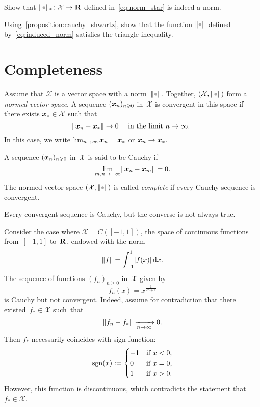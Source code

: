 \begin{exercise}
    Show that $\norm{\placeholder}_*\colon \mathcal X \to \real$ defined in~\eqref{eq:norm_star} is indeed a norm.
\end{exercise}

\begin{exercise}
    \label{exercise:triangle_inequality}
    Using~\cref{proposition:cauchy_shwartz},
    show that the function $\norm{\placeholder}$ defined by~\eqref{eq:induced_norm} satisfies the triangle inequality.
\end{exercise}

\section{Completeness}
Assume that $\mathcal X$ is a vector space with a norm~$\norm{\placeholder}$.
Together, $(\mathcal X,\norm{\placeholder})$ form a \emph{normed vector space}.
A sequence $(\mathbf{\boldsymbol{x}}_n)_{n \geqslant 0}$ in~$\mathcal X$ is convergent in this space
if there exists $\mathbf{\boldsymbol{x}}_* \in \mathcal X$ such that
\[
    \lVert\mathbf{\boldsymbol{x}}_n - \mathbf{\boldsymbol{x}}_*\rVert \to 0 \quad \text{ in the limit $n \to \infty$. }
\]
In this case,
we write $\lim_{n \to \infty} \mathbf{\boldsymbol{x}}_n = \mathbf{\boldsymbol{x}}_*$ or $\mathbf{\boldsymbol{x}}_n \to \mathbf{\boldsymbol{x}}_*$.
\begin{definition}
    A sequence $(\mathbf{\boldsymbol{x}}_n)_{n \geqslant 0}$ in~$\mathcal X$ is said to be Cauchy if
    \[
        \lim_{m, n \to +\infty} \lVert\mathbf{\boldsymbol{x}}_n - \mathbf{\boldsymbol{x}}_m\rVert = 0.
    \]
    The normed vector space $(\mathcal X, \norm{\placeholder})$ is called \emph{complete} if every Cauchy sequence is convergent.
\end{definition}
Every convergent sequence is Cauchy,
but the converse is not always true.

\begin{example}
    Consider the case where $\mathcal X = C([-1, 1])$,
    the space of continuous functions from~$[-1, 1]$ to~$\mathbf R$,
    endowed with the norm
    \[
        \lVert f\rVert = \int_{-1}^{1} \lvert f(x)\rvert \, \mathrm d x.
    \]
    The sequence of functions $(f_n)_{n\geq 0}$ in~$\mathcal X$ given by
    \begin{equation}
        \label{eq:example_non_complete}
        f_n(x) = x^{\frac{1}{2n+1}}
    \end{equation}
    is Cauchy but not convergent.
    Indeed, assume for contradiction that there existed~$f_* \in \mathcal X$ such~that
    \begin{equation}
        \label{eq:example_non_complete_convergence}
        \lVert f_n - f_*\rVert \xrightarrow[n \to \infty]{} 0.
    \end{equation}
    Then $f_*$ necessarily coincides with sign function:
    \[
        {\rm sgn}(x)
        :=\begin{cases}
            -1 & \text{if } x < 0, \\
            0 & \text{if } x = 0, \\
        1 & \text{if } x > 0. \end{cases}
    \]
    However, this function is discontinuous,
    which contradicts the statement that~$f_* \in \mathcal X$.
\end{example}

